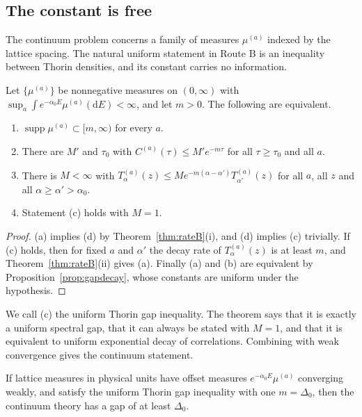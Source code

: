 \subsection{The constant is free}

The continuum problem concerns a family of measures $\mu^{(a)}$ indexed by the lattice spacing. The natural uniform statement in Route B is an inequality between Thorin densities, and its constant carries no information.

\begin{theorem}[equivalences]\label{thm:equivB}
Let $\{\mu^{(a)}\}$ be nonnegative measures on $(0,\infty)$ with $\sup_a\int e^{-\alpha_0E}\mu^{(a)}(\mathrm dE)<\infty$, and let $m>0$. The following are equivalent.
\begin{enumerate}
\item[(a)] $\operatorname{supp}\mu^{(a)}\subset[m,\infty)$ for every $a$.
\item[(b)] There are $M'$ and $\tau_0$ with $C^{(a)}(\tau)\le M'e^{-m\tau}$ for all $\tau\ge\tau_0$ and all $a$.
\item[(c)] There is $M<\infty$ with $T^{(a)}_\alpha(z)\le Me^{-m(\alpha-\alpha')}T^{(a)}_{\alpha'}(z)$ for all $a$, all $z$ and all $\alpha\ge\alpha'>\alpha_0$.
\item[(d)] Statement (c) holds with $M=1$.
\end{enumerate}
\end{theorem}

\begin{proof}
(a) implies (d) by Theorem~\ref{thm:rateB}(i), and (d) implies (c) trivially. If (c) holds, then for fixed $a$ and $\alpha'$ the decay rate of $T^{(a)}_\alpha(z)$ is at least $m$, and Theorem~\ref{thm:rateB}(ii) gives (a). Finally (a) and (b) are equivalent by Proposition~\ref{prop:gapdecay}, whose constants are uniform under the hypothesis.
\end{proof}

We call (c) the uniform Thorin gap inequality. The theorem says that it is exactly a uniform spectral gap, that it can always be stated with $M=1$, and that it is equivalent to uniform exponential decay of correlations. Combining with weak convergence gives the continuum statement.

\begin{corollary}[continuum]\label{cor:continuumB}
If lattice measures in physical units have offset measures $e^{-\alpha_0E}\mu^{(a)}$ converging weakly, and satisfy the uniform Thorin gap inequality with one $m=\Delta_0$, then the continuum theory has a gap of at least $\Delta_0$.
\end{corollary}

